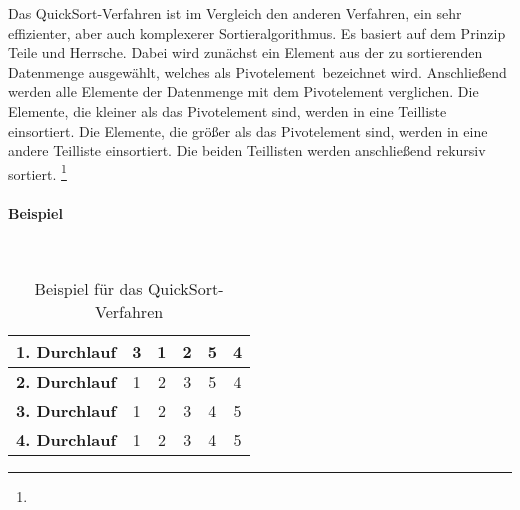 \documentclass[./entry.tex]{subfiles}
\begin{document}
    Das \dq QuickSort\dq-Verfahren ist im Vergleich den anderen Verfahren, ein sehr effizienter,
    aber auch komplexerer Sortieralgorithmus.
    Es basiert auf dem Prinzip \dq Teile und Herrsche\dq.
    Dabei wird zunächst ein Element aus der zu sortierenden Datenmenge ausgewählt,
    welches als \dq Pivotelement\dq\ bezeichnet wird.
    Anschließend werden alle Elemente der Datenmenge mit dem Pivotelement verglichen.
    Die Elemente, die kleiner als das Pivotelement sind, werden in eine Teilliste einsortiert.
    Die Elemente, die größer als das Pivotelement sind, werden in eine andere Teilliste einsortiert.
    Die beiden Teillisten werden anschließend rekursiv sortiert.
    \footnote{}

    \paragraph{Beispiel} \mbox{}\\

    \begin{table}[h]
        \centering
        \begin{tabular}{|c|c|c|c|c|c|}
            \hline
            \textbf{1. Durchlauf} & 3 & 1 & {\color{red}2} & 5 & 4 \\
            \hline
            \textbf{2. Durchlauf} & 1 & {\color{red}2} & 3 & 5 & 4 \\
            \hline
            \textbf{3. Durchlauf} & 1 & 2 & 3 & {\color{red}4} & 5 \\
            \hline
            \textbf{4. Durchlauf} & 1 & 2 & 3 & 4 & 5 \\
            \hline
        \end{tabular}
        \caption{Beispiel für das \dq QuickSort\dq-Verfahren}
        \label{tab:quicksort}
    \end{table}
\end{document}
